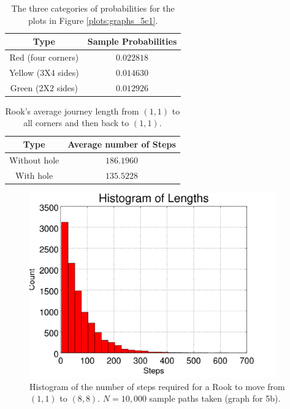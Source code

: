 \documentclass{amsart}
\numberwithin{equation}{section}
\begin{document}
\begin{table}[]
    \centering
    \begin{tabular}{|c|c|}
        \hline
        Type & Sample Probabilities \\
        \hline
        Red (four corners) & $0.022818$\\
        \hline
        Yellow (3X4 sides) & $0.014630$\\
        \hline
        Green (2X2 sides) & $0.012926$ \\
        \hline
    \end{tabular}
    \caption{The three categories of probabilities for the plots in Figure \ref{plots:graphs_5c1}.}
    \label{tab:region_probs}
\end{table}


\begin{table}[]
    \centering
    \begin{tabular}{|c|c|}
        \hline
        Type & Average number of Steps \\
        \hline
        Without hole & $186.1960$\\
        \hline
        With hole & $135.5228$\\
        \hline
    \end{tabular}
    \caption{Rook's average journey length from $(1,1)$ to all corners and then back to $(1,1)$.}
    \label{tab:avg_steps_journey2}
\end{table}

\begin{figure}
    \centering
    \includegraphics[width=0.95\textwidth]{figures/regular/figure_Rook_journey_N10000.png}
    \caption{Histogram of the number of steps required for a Rook to move from $(1,1)$ to $(8,8)$. $N=10,000$ sample paths taken (graph for 5b).}
    \label{plots:graphs_5b}
\end{figure}
\end{document}
